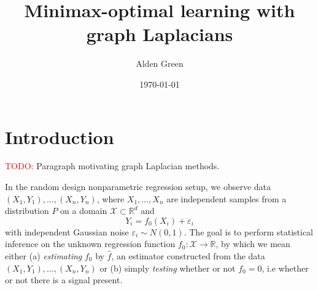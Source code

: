 \documentclass{article}
\newcommand{\Reals}{\mathbb{R}}
\newcommand{\1}{\mathbf{1}}
\newcommand{\Rd}{\Reals^d}
\newcommand{\Xset}{\mathcal{X}}
\newcommand{\wh}[1]{\widehat{#1}}
\theoremstyle{alden}
\theoremstyle{aldenthm}
\theoremstyle{definition}
\theoremstyle{remark}
\begin{document}
\title{Minimax-optimal learning with graph Laplacians}
\author{Alden Green}
\date{\today}
\maketitle

\section{Introduction}

\textcolor{red}{TODO:} Paragraph motivating graph Laplacian methods.

In the random design nonparametric regression setup, we observe data $(X_1,Y_1),\ldots,(X_n,Y_n)$, where $X_1,\ldots,X_n$ are independent samples from a distribution $P$ on a domain $\Xset \subset \Rd$ and 
\begin{equation}
\label{eqn:random_design_regression}
Y_i = f_0(X_i) + \varepsilon_i
\end{equation}
with independent Gaussian noise $\varepsilon_i \sim N(0,1)$. The goal is to perform statistical inference on the unknown regression function $f_0: \Xset \to \Reals$, by which we mean either (a) \emph{estimating} $f_0$ by $\wh{f}$, an estimator constructed from the data $(X_1,Y_1),\ldots,(X_n,Y_n)$ or (b) simply \emph{testing} whether or not $f_0 = 0$, i.e whether or not there is a signal present. 
\end{document}
